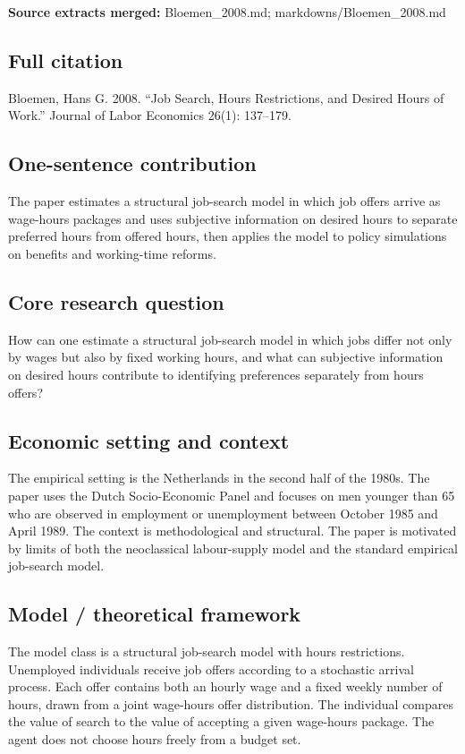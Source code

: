 \documentclass[11pt,a4paper]{article}
\begin{document}
\textbf{Source extracts merged:} Bloemen\_2008.md; markdowns/Bloemen\_2008.md

\subsection*{Full citation}
Bloemen, Hans G. 2008. “Job Search, Hours Restrictions, and Desired Hours of Work.” Journal of Labor Economics 26(1): 137–179.

\subsection*{One-sentence contribution}
The paper estimates a structural job-search model in which job offers arrive as wage-hours packages and uses subjective information on desired hours to separate preferred hours from offered hours, then applies the model to policy simulations on benefits and working-time reforms.

\subsection*{Core research question}
How can one estimate a structural job-search model in which jobs differ not only by wages but also by fixed working hours, and what can subjective information on desired hours contribute to identifying preferences separately from hours offers?

\subsection*{Economic setting and context}
The empirical setting is the Netherlands in the second half of the 1980s. The paper uses the Dutch Socio-Economic Panel and focuses on men younger than 65 who are observed in employment or unemployment between October 1985 and April 1989. The context is methodological and structural. The paper is motivated by limits of both the neoclassical labour-supply model and the standard empirical job-search model.

\subsection*{Model / theoretical framework}
The model class is a structural job-search model with hours restrictions. Unemployed individuals receive job offers according to a stochastic arrival process. Each offer contains both an hourly wage and a fixed weekly number of hours, drawn from a joint wage-hours offer distribution. The individual compares the value of search to the value of accepting a given wage-hours package. The agent does not choose hours freely from a budget set.
\end{document}
